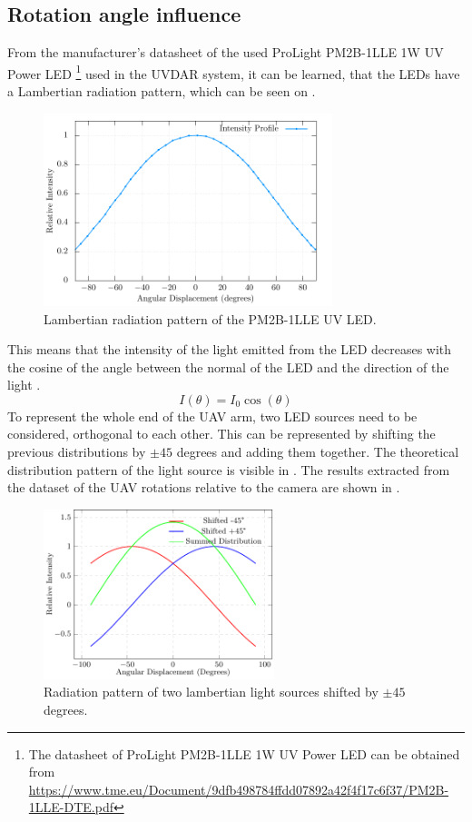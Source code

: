\subsection{Rotation angle influence}
From the manufacturer's datasheet of the used ProLight PM2B-1LLE 1W \ac{UV} Power \ac{LED} \footnote{The datasheet of ProLight PM2B-1LLE 1W UV Power LED can be obtained from \url{https://www.tme.eu/Document/9dfb498784ffdd07892a42f4f17c6f37/PM2B-1LLE-DTE.pdf}}
used in the UVDAR system, it can be learned, that the \ac{LED}s have a Lambertian radiation pattern,
which can be seen on .
\begin {figure}[H]
	\centering
	\includegraphics[width=0.75\textwidth]{./fig/semestral/lambertian/_new_lambertian.pdf}
	\caption{Lambertian radiation pattern of the PM2B-1LLE UV LED.}
	\label{fig:lambertian}
\end{figure}
This means that the intensity of the light emitted from the \ac{LED} decreases with the cosine
of the angle between the normal of the \ac{LED} and the direction of the light .
\begin{equation}
	I(\theta) = I_0\cos(\theta)
	\label{eq:lambertian}
\end{equation}
To represent the whole end of the \ac{UAV} arm, two \ac{LED} sources need to be considered, orthogonal to each other.
This can be represented by shifting the previous distributions by $\pm 45$ degrees and adding them together. The 
theoretical distribution pattern of the light source is visible in . 
The results extracted from the dataset of the \ac{UAV} rotations relative to the camera are shown in .
\begin {figure}[H]
	\centering
	\includegraphics[width=0.60\textwidth]{./fig/semestral/lambertian/3lambertian.pdf}
	\caption{Radiation pattern of two lambertian light sources shifted by $\pm 45$ degrees.}
	\label{fig:lambert_combined}
\end{figure}

